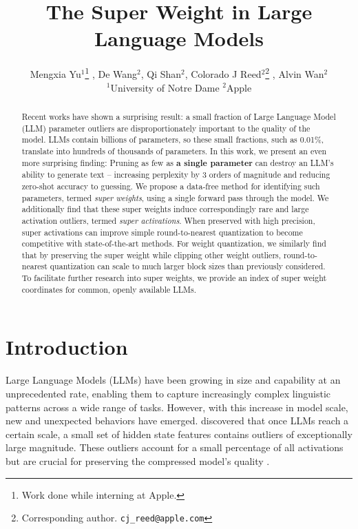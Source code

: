 \documentclass{article} %
\title{The Super Weight in Large Language Models}
\author{Mengxia Yu$^{1}$\thanks{Work done while interning at Apple.} , De Wang$^{2}$, Qi Shan$^{2}$, Colorado J Reed$^{2}$\thanks{ Corresponding author. \texttt{cj\_reed@apple.com}} , Alvin Wan$^{2} $\\
$^{1}$University of Notre Dame \quad 
$^{2}$Apple \quad
}
\begin{document}
\maketitle

\begin{abstract}

Recent works have shown a surprising result: a small fraction of Large Language Model (LLM) parameter outliers are disproportionately important to the quality of the model. 
LLMs contain billions of parameters, so these small fractions, such as 0.01\%, translate into hundreds of thousands of parameters. In this work, we present an even more surprising finding: Pruning as few as \textbf{a single parameter} can destroy an LLM's ability to generate text -- increasing perplexity by 3 orders of magnitude and reducing zero-shot accuracy to guessing. 
We propose a data-free method for identifying such parameters, termed \emph{super weights}, using a single forward pass through the model.
We additionally find that these super weights induce correspondingly rare and large activation outliers, termed \emph{super activations}. When preserved with high precision, super activations can improve simple round-to-nearest quantization to become competitive with state-of-the-art methods. For weight quantization, we similarly find that by preserving the super weight while clipping other weight outliers, round-to-nearest quantization can scale to much larger block sizes than previously considered.
To facilitate further research into super weights, we provide an index of super weight coordinates for common, openly available LLMs. 


\end{abstract}

\section{Introduction}


Large Language Models (LLMs) have been growing in size and capability at an unprecedented rate, enabling them to capture increasingly complex linguistic patterns across a wide range of tasks. However, with this increase in model scale, new and unexpected behaviors have emerged. 
\citet{NEURIPS2022_c3ba4962} discovered that once LLMs reach a certain scale, a small set of hidden state features contains outliers of exceptionally large magnitude. These outliers account for a small percentage of all activations but are crucial for preserving the compressed model's quality \citep{NEURIPS2022_c3ba4962, 10.5555/3618408.3619993, wei-etal-2023-outlier, shao2024omniquant}. 
\end{document}
